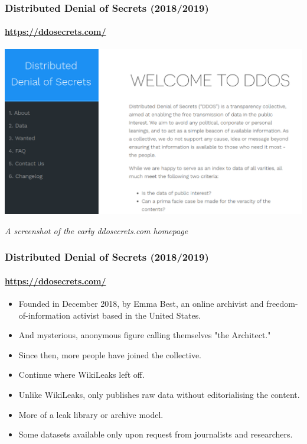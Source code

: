 \documentclass[aspectratio=169,usenames,dvipsnames]{beamer}
\begin{document}

\begin{frame}
  \frametitle{Distributed Denial of Secrets (2018/2019)}
  \framesubtitle{\url{https://ddosecrets.com/}}

  \centering

  \includegraphics[width=\textwidth,height=0.6\textheight,keepaspectratio]{img/ddosecrets.png}

  \vspace{5mm}

  \footnotesize
  \emph{A screenshot of the early ddosecrets.com homepage}

\end{frame}

\begin{frame}
  \frametitle{Distributed Denial of Secrets (2018/2019)}
  \framesubtitle{\url{https://ddosecrets.com/}}

  \begin{itemize}[<+->]
    \item Founded in December 2018, by Emma Best, an online archivist and
      freedom-of-information activist based in the United States.
    \item And mysterious, anonymous figure calling themselves "the Architect."
    \item Since then, more people have joined the collective.
    \item Continue where WikiLeaks left off.
    \item Unlike WikiLeaks, only publishes raw data without editorialising the
      content.
    \item More of a leak library or archive model.
    \item Some datasets available only upon request from journalists and
      researchers.
  \end{itemize}
\end{frame}
\end{document}
